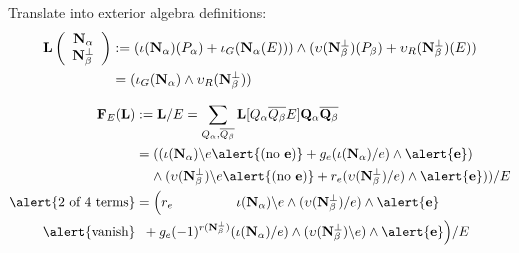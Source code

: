 \documentclass{beamer}
\newcommand{\ext}[1]{\ensuremath{\mathbf{#1}}}
\newcommand{\Is}{\ensuremath{\iota}}
\newcommand{\Vs}{\ensuremath{\upsilon}}
\begin{document}
\begin{frame}


\vspace{0.1in}Translate into exterior algebra definitions:
\[
\begin{split}
  \ext{L}\left( \begin{array}{c} \eNal\\ \eNbePe \end{array} \right)
   & := (\Is(\eNal)(P_\alpha) + \Is_G(\eNal(E)))\wedge(\Vs(\eNbePe)(P_\beta) + \Vs_R(\eNbePe)(E)) \\
  &  = (\Is_G(\eNal)\wedge\Vs_R(\eNbePe))
\end{split}
\]

\[
\begin{split}
  \ext{F}_E(\ext{L})& := \ext{L}/E = \sum_{Q_\alpha,\overline{Q_\beta}}\ext{L}[Q_\alpha \overline{Q_\beta} E]\ext{Q}_\alpha\overline{\ext{Q}_\beta} \\
  & =   ((\Is(\eNal)\backslash   e\alert{(\text{no\ }\ext{e})} + g_e(\Is(\eNal)/e)\wedge\alert{\ext{e}})                   \\
  & \;\;\;\;  \wedge  (\Vs(\eNbePe)\backslash e\alert{(\text{no\ }\ext{e})} + r_e(\Vs(\eNbePe)/e)\wedge \alert{\ext{e}}) ) / E \\
\alert{\text{2 of 4 terms}}  & = \Big( r_e  \;\;\; \;\;\;\;\;\;\;\;\;\;\;\;\;\; \Is(\ext{\eNal})\backslash e\wedge (\Vs(\eNbePe)/e)      \wedge  \alert{\ext{e}} \\
\alert{\text{vanish}}  & \;\;+ g_e (-1)^{r(\eNbePe)}(\Is(\eNal)/e)\wedge(\Vs(\eNbePe)\backslash e)    \wedge  \alert{\ext{e}}\Big) / E 
  \end{split}
\]
 

\end{frame}


\newcommand{\eNbe}{\ensuremath{\ext{N}_\beta}}
\newcommand{\Nbe}{\ensuremath{N_\beta}}
\end{document}
